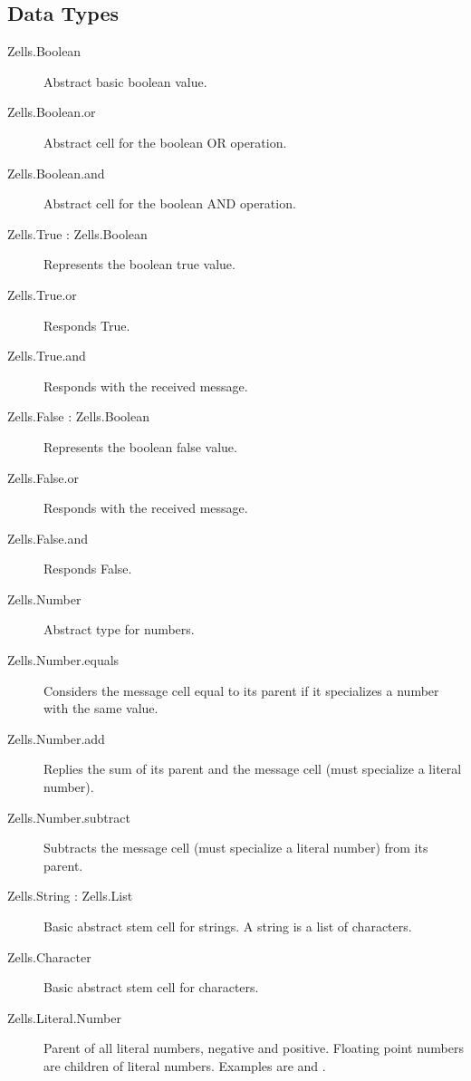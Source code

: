 \subsection{Data Types}
\begin{description}
\item[Zells.Boolean]{Abstract basic boolean value.}

\item[Zells.Boolean.or]{Abstract cell for the boolean OR operation.}

\item[Zells.Boolean.and]{Abstract cell for the boolean AND operation.}

\item[Zells.True : Zells.Boolean]{Represents the boolean true value.}

\item[Zells.True.or]{Responds True.}

\item[Zells.True.and]{Responds with the received message.}

\item[Zells.False : Zells.Boolean]{Represents the boolean false value.}

\item[Zells.False.or]{Responds with the received message.}

\item[Zells.False.and]{Responds False.}

\item[Zells.Number]{Abstract type for numbers.}

\item[Zells.Number.equals]{Considers the message cell equal to its parent if it specializes a number with the same value.}

\item[Zells.Number.add]{Replies the sum of its parent and the message cell (must specialize a literal number).}

\item[Zells.Number.subtract]{Subtracts the message cell (must specialize a literal number) from its parent.}

\item[Zells.String : Zells.List]{Basic abstract stem cell for strings. A string is a list of characters.}

\item[Zells.Character]{Basic abstract stem cell for characters.}

\item[Zells.Literal.Number]{Parent of all literal numbers, negative and positive. Floating point numbers are children of literal numbers. Examples are  and .}


\end{description}
